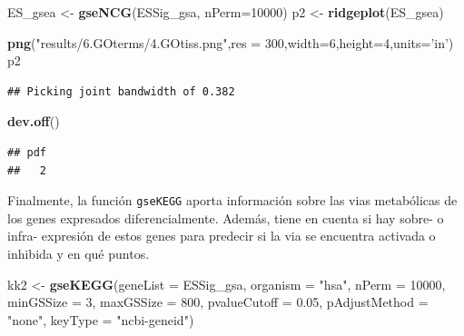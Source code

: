 \documentclass[
]{article}
\newenvironment{Shaded}{\begin{snugshade}}{\end{snugshade}}
\newcommand{\DataTypeTok}[1]{\textcolor[rgb]{0.13,0.29,0.53}{#1}}
\newcommand{\DecValTok}[1]{\textcolor[rgb]{0.00,0.00,0.81}{#1}}
\newcommand{\FloatTok}[1]{\textcolor[rgb]{0.00,0.00,0.81}{#1}}
\newcommand{\KeywordTok}[1]{\textcolor[rgb]{0.13,0.29,0.53}{\textbf{#1}}}
\newcommand{\NormalTok}[1]{#1}
\newcommand{\StringTok}[1]{\textcolor[rgb]{0.31,0.60,0.02}{#1}}
\begin{document}
\begin{Shaded}
\begin{Highlighting}[]
\NormalTok{ES_gsea <-}\StringTok{ }\KeywordTok{gseNCG}\NormalTok{(ESSig_gsa, }\DataTypeTok{nPerm=}\DecValTok{10000}\NormalTok{)}
\NormalTok{p2 <-}\StringTok{ }\KeywordTok{ridgeplot}\NormalTok{(ES_gsea)}
\end{Highlighting}
\end{Shaded}

\begin{Shaded}
\begin{Highlighting}[]
\KeywordTok{png}\NormalTok{(}\StringTok{"results/6.GOterms/4.GOtiss.png"}\NormalTok{,}\DataTypeTok{res =} \DecValTok{300}\NormalTok{,}\DataTypeTok{width=}\DecValTok{6}\NormalTok{,}\DataTypeTok{height=}\DecValTok{4}\NormalTok{,}\DataTypeTok{units=}\StringTok{'in'}\NormalTok{)}
\NormalTok{p2}
\end{Highlighting}
\end{Shaded}

\begin{verbatim}
## Picking joint bandwidth of 0.382
\end{verbatim}

\begin{Shaded}
\begin{Highlighting}[]
\KeywordTok{dev.off}\NormalTok{()}
\end{Highlighting}
\end{Shaded}

\begin{verbatim}
## pdf 
##   2
\end{verbatim}

Finalmente, la función \texttt{gseKEGG} aporta información sobre las
vias metabólicas de los genes expresados diferencialmente. Además, tiene
en cuenta si hay sobre- o infra- expresión de estos genes para predecir
si la via se encuentra activada o inhibida y en qué puntos.

\begin{Shaded}
\begin{Highlighting}[]
\NormalTok{kk2 <-}\StringTok{ }\KeywordTok{gseKEGG}\NormalTok{(}\DataTypeTok{geneList =}\NormalTok{ ESSig_gsa, }\DataTypeTok{organism =} \StringTok{"hsa"}\NormalTok{, }\DataTypeTok{nPerm =} \DecValTok{10000}\NormalTok{,}
               \DataTypeTok{minGSSize =} \DecValTok{3}\NormalTok{, }\DataTypeTok{maxGSSize =} \DecValTok{800}\NormalTok{, }\DataTypeTok{pvalueCutoff =} \FloatTok{0.05}\NormalTok{,}
               \DataTypeTok{pAdjustMethod =} \StringTok{"none"}\NormalTok{, }\DataTypeTok{keyType =} \StringTok{"ncbi-geneid"}\NormalTok{)}
\end{Highlighting}
\end{Shaded}
\end{document}
